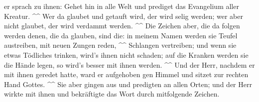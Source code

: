er sprach zu ihnen: Gehet hin in alle Welt und prediget das Evangelium
aller Kreatur. \^{}\^{}  Wer da glaubet und getauft wird,
der wird selig werden; wer aber nicht glaubet, der wird verdammt werden.
\^{}\^{}  Die Zeichen aber, die da folgen werden denen,
die da glauben, sind die: in meinem Namen werden sie Teufel austreiben,
mit neuen Zungen reden, \^{}\^{}  Schlangen vertreiben;
und wenn sie etwas Tödliches trinken, wird's ihnen nicht schaden; auf
die Kranken werden sie die Hände legen, so wird's besser mit ihnen
werden. \^{}\^{}  Und der Herr, nachdem er mit ihnen
geredet hatte, ward er aufgehoben gen Himmel und sitzet zur rechten Hand
Gottes. \^{}\^{}  Sie aber gingen aus und predigten an
allen Orten; und der Herr wirkte mit ihnen und bekräftigte das Wort
durch mitfolgende Zeichen.
